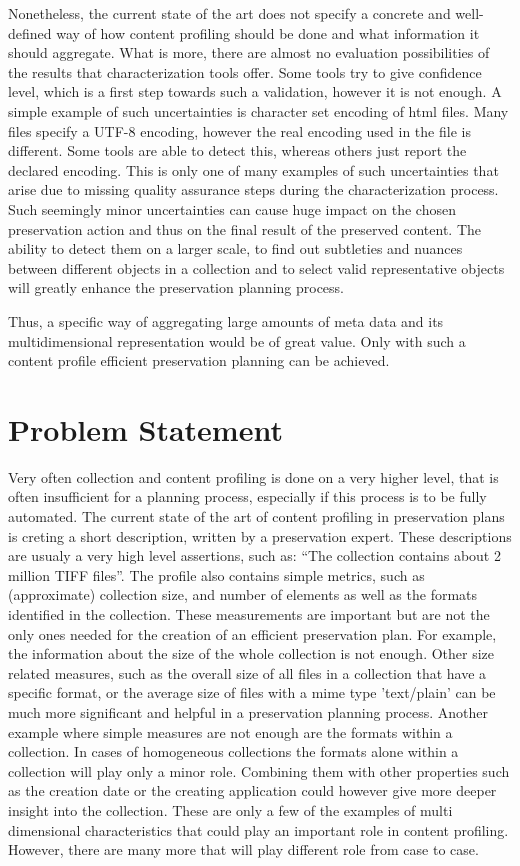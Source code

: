 Nonetheless, the current state of the art does not specify a concrete and well-defined way of how content profiling should be done and what information it should aggregate. What is more, there are almost no evaluation possibilities of the results that characterization tools offer. Some tools try to give confidence level, which is a first step towards such a validation, however it is not enough. A simple example of such uncertainties is character set encoding of html files. Many files specify a UTF-8 encoding, however the real encoding used in the file is different. Some tools are able to detect this, whereas others just report the declared encoding. This is only one of many examples of such uncertainties that arise due to missing quality assurance steps during the characterization process. Such seemingly minor uncertainties can cause huge impact on the chosen preservation action and thus on the final result of the preserved content. The ability to detect them on a larger scale, to find out subtleties and nuances between different objects in a collection and to select valid representative objects will greatly enhance the preservation planning process.

Thus, a specific way of aggregating large amounts of meta data and its multidimensional representation would be of great value. Only with such a content profile efficient preservation planning can be achieved.

\section{Problem Statement}
Very often collection and content profiling is done on a very higher level, that
is often insufficient for a planning process, especially if this process is to be fully automated.
The current state of the art of content profiling in preservation plans is creting a short description, written by a preservation expert. These descriptions are usualy a very high level assertions, such as: ``The collection contains about 2 million TIFF files''. The profile also contains simple metrics, such as (approximate) collection size, and number of elements as well as the formats identified in the collection. 
These measurements are important but are not the only ones needed for the creation of an efficient preservation plan.
For example, the information about the size of the whole collection is not enough. Other size related measures, such as the overall size of all files in a collection that have a specific format, or the average size of files with a mime type 'text/plain' can be much more significant and helpful in a preservation planning process. Another example where simple measures are not enough are the formats within a collection. In cases of homogeneous collections the formats alone within a collection will play only a minor role. Combining them with other properties such as the creation date or the creating application could however give more deeper insight into the collection.
These are only a few of the examples of multi dimensional characteristics that could play an important role in content profiling. However, there are many more that will play different role from case to case.

